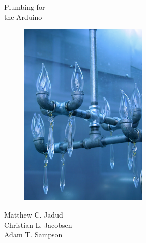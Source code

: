 \ 
\vspace{-3cm}
\fontsize{42}{42}\selectfont 
\begin{center}
\HRule \\
Plumbing for \\
the Arduino\vspace{-1cm}
\HRule
\end{center}

\normalsize

\begin{figure}[bph]
  \begin{center}
    \includegraphics[height=3.5in]{images/cover-light-fixture}
  \end{center}
\end{figure}

\begin{center}
	Matthew C. Jadud\\
	Christian L. Jacobsen\\
	Adam T. Sampson
\end{center}

\thispagestyle{empty}

\newpage

